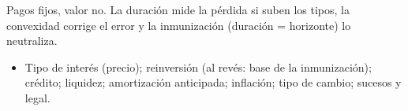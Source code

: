 \documentclass{article}
\begin{document}
\begin{columnas}
\begin{ideaclave}
Pagos fijos, valor no. La duración mide la pérdida si suben los tipos, la convexidad corrige el error y la inmunización (duración = horizonte) lo neutraliza.
\end{ideaclave}

\begin{itemize}
\item Tipo de interés (precio); reinversión (al revés: base de la inmunización); crédito; liquidez; amortización anticipada; inflación; tipo de cambio; sucesos y legal.
\end{itemize}


\end{columnas}
\end{document}
